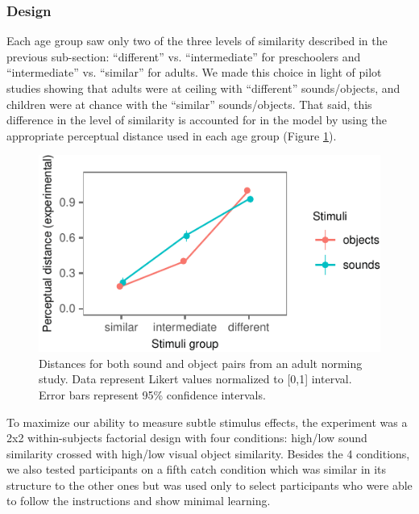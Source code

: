 \documentclass[10pt, letterpaper]{article}
\newenvironment{CodeChunk}{}{}
\begin{document}
\subsubsection{Design}\label{design}

Each age group saw only two of the three levels of similarity described
in the previous sub-section: ``different'' vs. ``intermediate'' for
preschoolers and ``intermediate'' vs. ``similar'' for adults. We made
this choice in light of pilot studies showing that adults were at
ceiling with ``different'' sounds/objects, and children were at chance
with the ``similar'' sounds/objects. That said, this difference in the
level of similarity is accounted for in the model by using the
appropriate perceptual distance used in each age group (Figure
\ref{fig:stim}).

\begin{CodeChunk}
\begin{figure}[h]

{\centering \includegraphics{figs/stim-1} 

}

\caption{\label{fig:stim}Distances for both sound and object pairs from an adult norming study. Data represent Likert values normalized to [0,1] interval. Error bars represent 95\% confidence intervals.}\label{fig:stim}
\end{figure}
\end{CodeChunk}

To maximize our ability to measure subtle stimulus effects, the
experiment was a 2x2 within-subjects factorial design with four
conditions: high/low sound similarity crossed with high/low visual
object similarity. Besides the 4 conditions, we also tested participants
on a fifth catch condition which was similar in its structure to the
other ones but was used only to select participants who were able to
follow the instructions and show minimal learning.
\end{document}
